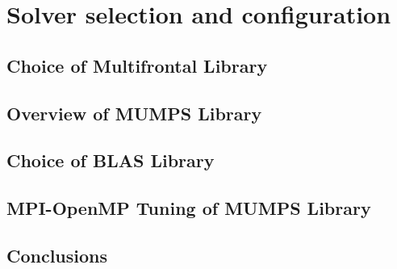 \chapter{Solver selection and configuration}
\label{chapter:solver configuration}





















\section{Choice of Multifrontal Library}
\label{subseq:multifrontal method}



\section{Overview of MUMPS Library}
\label{subseq:multifrontal-method}





\section{Choice of BLAS Library}
\label{subseq:blas-comparison}




\section{MPI-OpenMP Tuning of MUMPS Library}
\label{subseq:mpi-openmp}


\section{Conclusions}
\label{subseq:conclusions}




